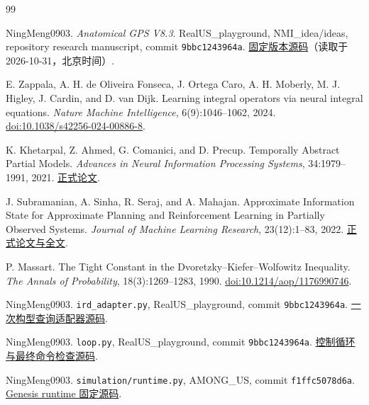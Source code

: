 \documentclass[11pt,a4paper,fontset=fandol]{ctexart}
\theoremstyle{definition}
\theoremstyle{remark}
\numberwithin{equation}{section}
\begin{document}
\clearpage
\begin{thebibliography}{99}
\small
{}
NingMeng0903. \emph{Anatomical GPS V8.3}. RealUS\_playground, NMI\_idea/ideas, repository research manuscript, commit \texttt{9bbc1243964a}. \href{https://github.com/NingMeng0903/RealUS_playground/blob/9bbc1243964acff4fb47185fec1e148e748f42a2/NMI_idea/ideas/Anatomical_GPS_V8.3.tex}{固定版本源码}（读取于 2026-10-31，北京时间）.

E. Zappala, A. H. de Oliveira Fonseca, J. Ortega Caro, A. H. Moberly, M. J. Higley, J. Cardin, and D. van Dijk.
Learning integral operators via neural integral equations.
\emph{Nature Machine Intelligence}, 6(9):1046--1062, 2024.
\href{https://doi.org/10.1038/s42256-024-00886-8}{doi:10.1038/s42256-024-00886-8}.

K. Khetarpal, Z. Ahmed, G. Comanici, and D. Precup.
Temporally Abstract Partial Models.
\emph{Advances in Neural Information Processing Systems}, 34:1979--1991, 2021.
\href{https://papers.nips.cc/paper/2021/file/0f3d014eead934bbdbacb62a01dc4831-Paper.pdf}{正式论文}.

J. Subramanian, A. Sinha, R. Seraj, and A. Mahajan.
Approximate Information State for Approximate Planning and Reinforcement Learning in Partially Observed Systems.
\emph{Journal of Machine Learning Research}, 23(12):1--83, 2022.
\href{https://jmlr.org/papers/v23/20-1165.html}{正式论文与全文}.

P. Massart. The Tight Constant in the Dvoretzky--Kiefer--Wolfowitz Inequality.
\emph{The Annals of Probability}, 18(3):1269--1283, 1990.
\href{https://doi.org/10.1214/aop/1176990746}{doi:10.1214/aop/1176990746}.

NingMeng0903. \texttt{ird\_adapter.py}, RealUS\_playground, commit \texttt{9bbc1243964a}.
\href{https://github.com/NingMeng0903/RealUS_playground/blob/9bbc1243964acff4fb47185fec1e148e748f42a2/rm75_control/rm75_control/control/joint_admittance_8dof/tasks/ird_adapter.py}{一次构型查询适配器源码}.

NingMeng0903. \texttt{loop.py}, RealUS\_playground, commit \texttt{9bbc1243964a}.
\href{https://github.com/NingMeng0903/RealUS_playground/blob/9bbc1243964acff4fb47185fec1e148e748f42a2/rm75_control/rm75_control/control/joint_admittance_8dof/loop.py}{控制循环与最终命令检查源码}.

NingMeng0903. \texttt{simulation/runtime.py}, AMONG\_US, commit \texttt{f1ffc5078d6a}.
\href{https://github.com/NingMeng0903/AMONG_US/blob/f1ffc5078d6a08c32b59107ab16086a7bbde488e/src/projects/genesis_ue_sync/sim_platform/simulation/runtime.py}{Genesis runtime 固定源码}.


\end{thebibliography}
\end{document}

